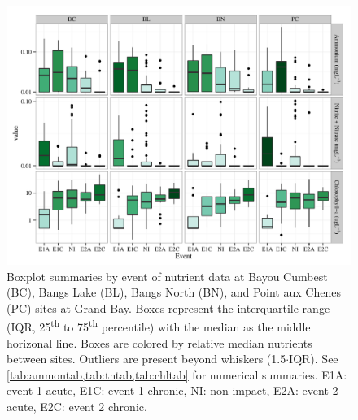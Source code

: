 \documentclass[letterpaper,12pt]{article}\usepackage[]{graphicx}\usepackage[]{color}
\makeatletter
\def\maxwidth{ %
  \ifdim\Gin@nat@width>\linewidth
    \linewidth
  \else
    \Gin@nat@width
  \fi
}
\newcommand{\beginsupplement}{%
        \setcounter{table}{0}
        \renewcommand{\thetable}{S\arabic{table}}%
        \setcounter{figure}{0}
        \renewcommand{\thefigure}{S\arabic{figure}}%
     }
\makeatother
\begin{document}
\clearpage

\beginsupplement

\begin{figure}[!ht]

{\centering \includegraphics[width=\maxwidth]{figs/boxplt_all-1} 

}

\caption{Boxplot summaries by event of nutrient data at Bayou Cumbest (BC), Bangs Lake (BL), Bangs North (BN), and Point aux Chenes (PC) sites at Grand Bay.  Boxes represent the interquartile range (IQR, 25\textsuperscript{th} to 75\textsuperscript{th} percentile) with the median as the middle horizonal line.  Boxes are colored by relative median nutrients between sites.  Outliers are present beyond whiskers (1.5$\cdot$IQR). See \cref{tab:ammontab,tab:tntab,tab:chltab} for numerical summaries.  E1A: event 1 acute, E1C: event 1 chronic, NI: non-impact, E2A: event 2 acute, E2C: event 2 chronic.}\label{fig:boxplt_all}
\end{figure}


\clearpage
\end{document}

